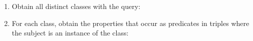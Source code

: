 																																																																																																																																																																																																																																																																																																																																																																																																																																																																																																																																																			\begin{enumerate}[leftmargin=0cm]
																																																																																																																																																																																																																																																																																																																																																																																																																																																																																																																																																				\item Obtain all distinct classes with the query:\\
																																																																																																																																																																																																																																																																																																																																																																																																																																																																																																																																																							\item For each class, obtain the properties that occur as predicates in triples where the subject is an instance of the class:\\

\end{enumerate}
